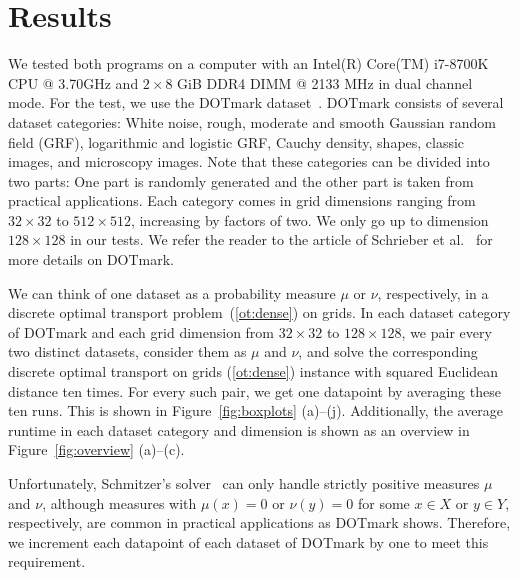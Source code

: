 \documentclass[a4paper,UKenglish,cleveref, autoref, thm-restate]{lipics-v2021}
\begin{document}
\section{Results}\label{sec:res}
We tested both programs on a computer with an Intel(R) Core(TM) i7-8700K CPU @ 3.70GHz and $2 \times 8$ GiB DDR4 DIMM @ 2133 MHz in dual channel mode.
For the test, we use the DOTmark dataset~\cite{schrieber2017dotmark}.
DOTmark consists of several dataset categories: White noise, rough, moderate and smooth Gaussian random field (GRF), logarithmic and logistic GRF, Cauchy density, shapes, classic images, and microscopy images.
Note that these categories can be divided into two parts: One part is randomly generated and the other part is taken from practical applications.
Each category comes in grid dimensions ranging from $32 \times 32$ to $512 \times 512$, increasing by factors of two.
We only go up to dimension $128 \times 128$ in our tests.
We refer the reader to the article of Schrieber et al.~\cite{schrieber2017dotmark} for more details on DOTmark.

We can think of one dataset as a probability measure $\mu$ or $\nu$, respectively, in a discrete optimal transport problem~(\ref{ot:dense}) on grids.
In each dataset category of DOTmark and each grid dimension from $32 \times 32$ to $128 \times 128$, we pair every two distinct datasets, consider them as $\mu$ and $\nu$, and solve the corresponding discrete optimal transport on grids (\ref{ot:dense}) instance with squared Euclidean distance ten times.
For every such pair, we get one datapoint by averaging these ten runs.
This is shown in Figure~\ref{fig:boxplots} (a)--(j).
Additionally, the average runtime in each dataset category and dimension is shown as an overview in Figure~\ref{fig:overview} (a)--(c).

Unfortunately, Schmitzer's solver~\cite{schmitzer2016sparse} can only handle strictly positive measures $\mu$ and $\nu$, although measures with $\mu(x)=0$ or $\nu(y)=0$ for some $x \in X$ or $y \in Y$, respectively, are common in practical applications as DOTmark shows.
Therefore, we increment each datapoint of each dataset of DOTmark by one to meet this requirement.
\end{document}
